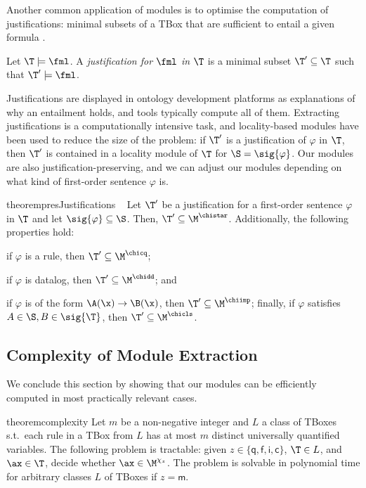 Another common application of modules is to optimise the
computation of justifications: minimal subsets of
a TBox that are sufficient to entail a given formula
\cite{DBLP:conf/semweb/KalyanpurPHS07,DBLP:conf/aswc/SuntisrivarapornQJH08}.
%
\begin{definition}
  Let $\T\models\fml$. A \emph{justification
    for $\fml$ in $\T$} is a minimal subset $\T'\subseteq\T$ such that
  $\T'\models\fml$.
\end{definition}
%
Justifications are displayed in ontology development
platforms as explanations of why an entailment holds, and 
tools typically compute all of them. Extracting justifications
is a computationally intensive task, and locality-based modules have
been used to reduce the size of the problem: if $\T'$
is a justification of $\varphi$ in $\T$, then $\T'$ is contained in
a locality module of $\T$ for  $\S = \sig{\varphi}$. 
Our modules are
also justification-preserving, and we can adjust
our modules depending on what kind of first-order sentence $\varphi$ is.
%
\begin{restatable}{theorem}{presJustifications} \label{thm:presJustifications} ~
 Let $\T'$ be a justification for a first-order sentence $\varphi$ in $\T$ and let
 $\sig{\varphi} \subseteq \S$. Then, $\T' \subseteq \M^{\chistar}$. Additionally,
 the following properties hold:
 \begin{inparaenum}[\it (i)]
 \item if $\varphi$ is a rule, then $\T' \subseteq \M^{\chicq}$;
 \item if $\varphi$ is datalog, then $\T' \subseteq \M^{\chidd}$; and
 \item if $\varphi$ %
   is of the form $\A(\x)\to\B(\x)$, then $\T' \subseteq
   \M^{\chiimp}$; finally, if $\varphi$ satisfies
   $A \in \S, B \in \sig{\T}$, then
   $\T' \subseteq \M^{\chicls}$.
 \end{inparaenum}
\end{restatable}



\subsection{Complexity of Module Extraction}
\label{sec:complexity}
 
We conclude this section by showing that our modules can be 
efficiently computed in most practically relevant cases. 

\begin{restatable}{theorem}{complexity} \label{thm:complexity} %
  Let $m$ be a non-negative integer and $L$ a class of TBoxes s.t.\ 
  each rule in a TBox from $L$ has at most $m$
  distinct universally quantified variables.  The following problem is
  tractable: given $z \in \{\mathsf{q}, \mathsf{f}, \mathsf{i}, \mathsf{c}\}$, $\T\in L$, and 
  $\ax\in\T$, decide whether \mbox{$\ax\in\M^{\chi_z}$}.
 The problem is solvable in polynomial time for arbitrary classes $L$ of TBoxes if
 $z = \mathsf{m}$. 
\end{restatable}

